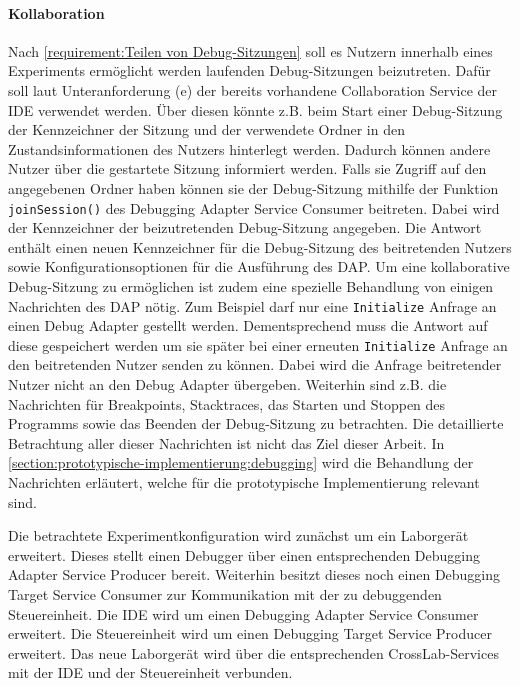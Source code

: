 \paragraph{Kollaboration} Nach \autoref{requirement:Teilen von Debug-Sitzungen} soll es Nutzern innerhalb eines Experiments ermöglicht werden laufenden Debug-Sitzungen beizutreten. Dafür soll laut Unteranforderung (e) der bereits vorhandene Collaboration Service der IDE verwendet werden. Über diesen könnte z.B. beim Start einer Debug-Sitzung der Kennzeichner der Sitzung und der verwendete Ordner in den Zustandsinformationen des Nutzers hinterlegt werden. Dadurch können andere Nutzer über die gestartete Sitzung informiert werden. Falls sie Zugriff auf den angegebenen Ordner haben können sie der Debug-Sitzung mithilfe der Funktion \texttt{joinSession()} des Debugging Adapter Service Consumer beitreten. Dabei wird der Kennzeichner der beizutretenden Debug-Sitzung angegeben. Die Antwort enthält einen neuen Kennzeichner für die Debug-Sitzung des beitretenden Nutzers sowie Konfigurationsoptionen für die Ausführung des \ac{DAP}. Um eine kollaborative Debug-Sitzung zu ermöglichen ist zudem eine spezielle Behandlung von einigen Nachrichten des \ac{DAP} nötig. Zum Beispiel darf nur eine \texttt{Initialize} Anfrage an einen Debug Adapter gestellt werden. Dementsprechend muss die Antwort auf diese gespeichert werden um sie später bei einer erneuten \texttt{Initialize} Anfrage an den beitretenden Nutzer senden zu können. Dabei wird die Anfrage beitretender Nutzer nicht an den Debug Adapter übergeben. Weiterhin sind z.B. die Nachrichten für Breakpoints, Stacktraces, das Starten und Stoppen des Programms sowie das Beenden der Debug-Sitzung zu betrachten. Die detaillierte Betrachtung aller dieser Nachrichten ist nicht das Ziel dieser Arbeit. In \autoref{section:prototypische-implementierung:debugging} wird die Behandlung der Nachrichten erläutert, welche für die prototypische Implementierung relevant sind.

Die betrachtete Experimentkonfiguration wird zunächst um ein Laborgerät erweitert. Dieses stellt einen Debugger über einen entsprechenden Debugging Adapter Service Producer bereit. Weiterhin besitzt dieses noch einen Debugging Target Service Consumer zur Kommunikation mit der zu debuggenden Steuereinheit. Die IDE wird um einen Debugging Adapter Service Consumer erweitert. Die Steuereinheit wird um einen Debugging Target Service Producer erweitert. Das neue Laborgerät wird über die entsprechenden CrossLab-Services mit der IDE und der Steuereinheit verbunden.